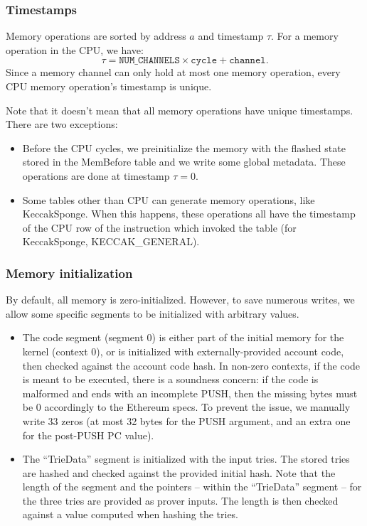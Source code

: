 \subsubsection{Timestamps}

Memory operations are sorted by address $a$ and timestamp $\tau$. For a memory operation in the CPU, we have:
$$\tau = \texttt{NUM\_CHANNELS} \times \texttt{cycle} + \texttt{channel}.$$
Since a memory channel can only hold at most one memory operation, every CPU memory operation's timestamp is unique.

Note that it doesn't mean that all memory operations have unique timestamps. There are two exceptions:

\begin{itemize}
  \item Before the CPU cycles, we preinitialize the memory with the flashed state stored in the MemBefore table and we write some global metadata. These operations are done at timestamp $\tau = 0$.
  \item Some tables other than CPU can generate memory operations, like KeccakSponge. When this happens, these operations all have the timestamp of the CPU row of the instruction which invoked the table (for KeccakSponge, KECCAK\_GENERAL).
\end{itemize}

\subsubsection{Memory initialization}

By default, all memory is zero-initialized. However, to save numerous writes, we allow some specific segments to be initialized with arbitrary values.

\begin{itemize}
  \item The code segment (segment 0) is either part of the initial memory for the kernel (context 0), or is initialized with externally-provided account code, then checked against the account code hash.
In non-zero contexts, if the code is meant to be executed, there is a soundness concern: if the code is malformed and ends with an incomplete PUSH, then the missing bytes must
be 0 accordingly to the Ethereum specs. To prevent the issue, we manually write 33 zeros (at most 32 bytes for the PUSH argument, and an extra one for
the post-PUSH PC value).
  \item The ``TrieData'' segment is initialized with the input tries. The stored tries are hashed and checked against the provided initial hash. Note that the length of the segment and the pointers -- within the ``TrieData'' segment -- for the three tries are provided as prover inputs. The length is then checked against a value computed when hashing the tries.
\end{itemize}

